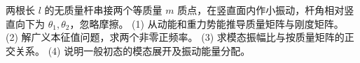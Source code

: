 两根长 $l$ 的无质量杆串接两个等质量 $m$ 质点，在竖直面内作小振动，杆角相对竖直向下为 $\theta_1,\theta_2$，忽略摩擦。
(1) 从动能和重力势能推导质量矩阵与刚度矩阵。
(2) 解广义本征值问题，求两个非零正频率。
(3) 求模态振幅比与按质量矩阵的正交关系。
(4) 说明一般初态的模态展开及振动能量分配。
